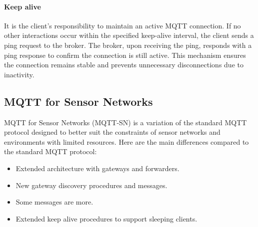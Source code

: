 \paragraph{Keep alive}
It is the client's responsibility to maintain an active MQTT connection. 
If no other interactions occur within the specified keep-alive interval, the client sends a ping request to the broker. 
The broker, upon receiving the ping, responds with a ping response to confirm the connection is still active. 
This mechanism ensures the connection remains stable and prevents unnecessary disconnections due to inactivity.

\subsection{MQTT for Sensor Networks}
MQTT for Sensor Networks (MQTT-SN) is a variation of the standard MQTT protocol designed to better suit the constraints of sensor networks and environments with limited resources. 
Here are the main differences compared to the standard MQTT protocol:
\begin{itemize}
    \item Extended architecture with gateways and forwarders.
    \item New gateway discovery procedures and messages. 
    \item Some messages are more.
    \item Extended keep alive procedures to support sleeping clients.
\end{itemize}